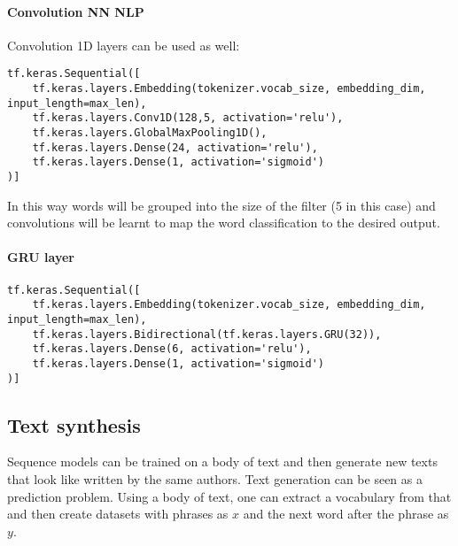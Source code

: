 \paragraph{Convolution NN NLP}
Convolution 1D layers can be used as well:
\begin{lstlisting}
tf.keras.Sequential([
	tf.keras.layers.Embedding(tokenizer.vocab_size, embedding_dim, input_length=max_len),
	tf.keras.layers.Conv1D(128,5, activation='relu'),
	tf.keras.layers.GlobalMaxPooling1D(),
	tf.keras.layers.Dense(24, activation='relu'),
	tf.keras.layers.Dense(1, activation='sigmoid')
)]
\end{lstlisting}
In this way words will be grouped into the size of the filter (5 in this case) and convolutions will be learnt to map the word classification to the desired output.

\paragraph{GRU layer}
\begin{lstlisting}
tf.keras.Sequential([
	tf.keras.layers.Embedding(tokenizer.vocab_size, embedding_dim, input_length=max_len),
	tf.keras.layers.Bidirectional(tf.keras.layers.GRU(32)),
	tf.keras.layers.Dense(6, activation='relu'),
	tf.keras.layers.Dense(1, activation='sigmoid')
)]
\end{lstlisting}

\subsection{Text synthesis}
Sequence models can be trained on a body of text and then generate new texts that look like written by the same authors. Text generation can be seen as a prediction problem. Using a body of text, one can extract a vocabulary from that and then create datasets with phrases as $x$ and the next word after the phrase as $y$.

